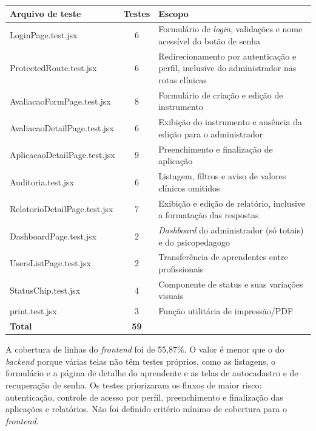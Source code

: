 \begin{quadro}[H]
\centering
\footnotesize
\caption{Distribuição dos testes automatizados do \textit{frontend}}
\begin{tabular}{|p{5.2cm}|c|p{7.6cm}|}
\hline
\textbf{Arquivo de teste} & \textbf{Testes} & \textbf{Escopo} \\ \hline
LoginPage.test.jsx & 6 & Formulário de \textit{login}, validações e nome acessível do botão de senha \\ \hline
ProtectedRoute.test.jsx & 6 & Redirecionamento por autenticação e perfil, inclusive do administrador nas rotas clínicas \\ \hline
AvaliacaoFormPage.test.jsx & 8 & Formulário de criação e edição de instrumento \\ \hline
AvaliacaoDetailPage.test.jsx & 6 & Exibição do instrumento e ausência da edição para o administrador \\ \hline
AplicacaoDetailPage.test.jsx & 9 & Preenchimento e finalização de aplicação \\ \hline
Auditoria.test.jsx & 6 & Listagem, filtros e aviso de valores clínicos omitidos \\ \hline
RelatorioDetailPage.test.jsx & 7 & Exibição e edição de relatório, inclusive a formatação das respostas \\ \hline
DashboardPage.test.jsx & 2 & \textit{Dashboard} do administrador (só totais) e do psicopedagogo \\ \hline
UsersListPage.test.jsx & 2 & Transferência de aprendentes entre profissionais \\ \hline
StatusChip.test.jsx & 4 & Componente de status e suas variações visuais \\ \hline
print.test.jsx & 3 & Função utilitária de impressão/PDF \\ \hline
\textbf{Total} & \textbf{59} & \\ \hline
\end{tabular}
\label{qua:testes_frontend}
\end{quadro}

A cobertura de linhas do \textit{frontend} foi de 55,87\%. O valor é menor que o do \textit{backend} porque várias telas não têm testes próprios, como as listagens, o formulário e a página de detalhe do aprendente e as telas de autocadastro e de recuperação de senha. Os testes priorizaram os fluxos de maior risco: autenticação, controle de acesso por perfil, preenchimento e finalização das aplicações e relatórios. Não foi definido critério mínimo de cobertura para o \textit{frontend}.


